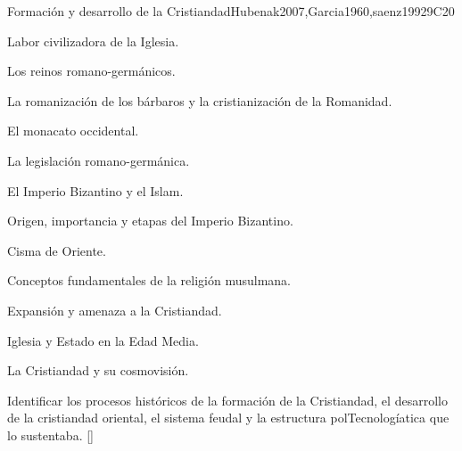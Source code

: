 \begin{syllabus}
\begin{unit}{}{Formación y desarrollo de la Cristiandad}{Hubenak2007,Garcia1960,saenz1992}{9}{C20}
\begin{topics}
	\item Labor civilizadora de la Iglesia.
	    \begin{subtopics}
		\item Los reinos romano-germánicos.
		\item La romanización de los bárbaros y la cristianización de la Romanidad.
		\item El monacato occidental.
		\item La legislación romano-germánica.
	    \end{subtopics}
	\item El Imperio Bizantino y el Islam.
	    \begin{subtopics}
		\item Origen, importancia y etapas del Imperio Bizantino.
		\item Cisma de Oriente.
		\item Conceptos fundamentales de la religión musulmana.
		\item Expansión y amenaza a la Cristiandad.
	    \end{subtopics}
	\item Iglesia y Estado en la Edad Media.
	\item La Cristiandad y su cosmovisión.
\end{topics}
\begin{learningoutcomes}
	\item Identificar los procesos históricos de la formación de la Cristiandad, el desarrollo de la cristiandad oriental, el sistema feudal y la estructura polTecnologíatica que lo sustentaba. [\Familiarity]
\end{learningoutcomes}
\end{unit}


\end{syllabus}
